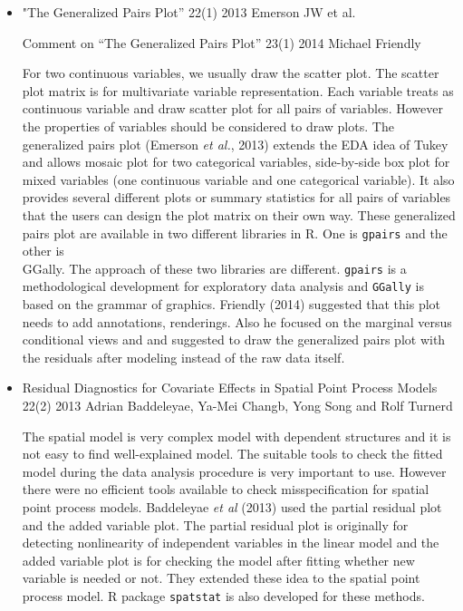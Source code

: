 \documentclass{article}
\begin{document}
\begin{itemize}
\item "The Generalized Pairs Plot” 22(1) 2013 Emerson JW et al.

Comment on “The Generalized Pairs Plot” 23(1) 2014 Michael Friendly

For two continuous variables, we usually draw the scatter plot. The scatter plot matrix is for multivariate variable representation. Each variable treats as continuous variable and draw scatter plot for all pairs of variables. However
the properties of variables should be considered to draw plots. The generalized pairs plot (Emerson {\it et al.}, 2013) extends the EDA idea of Tukey and allows mosaic plot for two categorical variables, side-by-side box plot for mixed variables (one continuous variable and one categorical variable). It also provides several different plots or summary statistics for all pairs of variables that the users can design the plot matrix on their own way. These generalized pairs plot are available in two different libraries in R. One is {\tt gpairs} and the other is {\\ GGally}. The approach of these two libraries are different. {\tt gpairs} is a methodological development for exploratory data analysis and {\tt GGally} is based on the grammar of graphics. Friendly (2014) suggested that this plot needs to add annotations, renderings. Also he focused on the marginal versus conditional views and and suggested to draw the generalized pairs plot with the residuals after modeling instead of the raw data itself.

\item Residual Diagnostics for Covariate Effects in Spatial Point Process Models 22(2) 2013 Adrian Baddeleyae, Ya-Mei Changb, Yong Song and Rolf Turnerd

    The spatial model is very complex model with dependent structures and it is not easy to find well-explained model. The suitable tools to check the fitted model during the data analysis procedure is very important to use. However there were no efficient tools available to check misspecification for spatial point process models.  Baddeleyae {\it et al} (2013) used the partial residual plot and the added variable plot. The partial residual plot is originally for detecting nonlinearity of independent variables in the linear model and the added variable plot is for checking the model after fitting whether new variable is needed or not. They extended these idea to the spatial point process model.  R package {\tt spatstat} is also developed for these methods.



\end{itemize}
\end{document}
